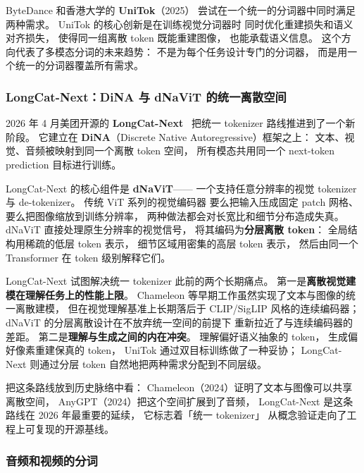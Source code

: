 ByteDance 和香港大学的 \textbf{UniTok}（2025）
尝试在一个统一的分词器中同时满足两种需求。
UniTok 的核心创新是在训练视觉分词器时
同时优化重建损失和语义对齐损失，
使得同一组离散 token 既能重建图像，
也能承载语义信息。
这个方向代表了多模态分词的未来趋势：
不是为每个任务设计专门的分词器，
而是用一个统一的分词器覆盖所有需求。

\subsubsection{LongCat-Next：DiNA 与 dNaViT 的统一离散空间}

2026 年 4 月美团开源的 \textbf{LongCat-Next}~\cite{meituan2026longcatnext}
把统一 tokenizer 路线推进到了一个新阶段。
它建立在 \textbf{DiNA}（Discrete Native Autoregressive）框架之上：
文本、视觉、音频被映射到同一个离散 token 空间，
所有模态共用同一个 next-token prediction 目标进行训练。

LongCat-Next 的核心组件是 \textbf{dNaViT}——
一个支持任意分辨率的视觉 tokenizer 与 de-tokenizer。
传统 ViT 系列的视觉编码器
要么把输入压成固定 patch 网格、
要么把图像缩放到训练分辨率，
两种做法都会对长宽比和细节分布造成失真。
dNaViT 直接处理原生分辨率的视觉信号，
将其编码为\textbf{分层离散 token}：
全局结构用稀疏的低层 token 表示，
细节区域用密集的高层 token 表示，
然后由同一个 Transformer 在 token 级别解释它们。

LongCat-Next 试图解决统一 tokenizer 此前的两个长期痛点。
第一是\textbf{离散视觉建模在理解任务上的性能上限}。
Chameleon 等早期工作虽然实现了文本与图像的统一离散建模，
但在视觉理解基准上长期落后于 CLIP/SigLIP 风格的连续编码器；
dNaViT 的分层离散设计在不放弃统一空间的前提下
重新拉近了与连续编码器的差距。
第二是\textbf{理解与生成之间的内在冲突}。
理解偏好语义抽象的 token，
生成偏好像素重建保真的 token，
UniTok 通过双目标训练做了一种妥协；
LongCat-Next 则通过分层 token 自然地把两种需求分配到不同层级。

把这条路线放到历史脉络中看：
Chameleon（2024）证明了文本与图像可以共享离散空间，
AnyGPT（2024）把这个空间扩展到了音频，
LongCat-Next 是这条路线在 2026 年最重要的延续，
它标志着「统一 tokenizer」
从概念验证走向了工程上可复现的开源基线。

\subsubsection{音频和视频的分词}

